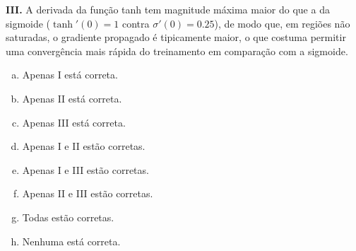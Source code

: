 \documentclass{dlproblemset}
\begin{document}
\begin{enumerate}[1)]
    \textbf{III.} A derivada da função tanh tem magnitude máxima maior do que a da sigmoide ($\tanh'(0) = 1$ contra $\sigma'(0) = 0.25$), de modo que, em regiões não saturadas, o gradiente propagado é tipicamente maior, o que costuma permitir uma convergência mais rápida do treinamento em comparação com a sigmoide.

    \begin{enumerate}[(a)]
        \item Apenas I está correta.
        \item Apenas II está correta.
        \item Apenas III está correta.
        \item Apenas I e II estão corretas.
        \item Apenas I e III estão corretas.
        \item Apenas II e III estão corretas.
        \item Todas estão corretas.
        \item Nenhuma está correta.
    \end{enumerate}


\end{enumerate}
\end{document}
